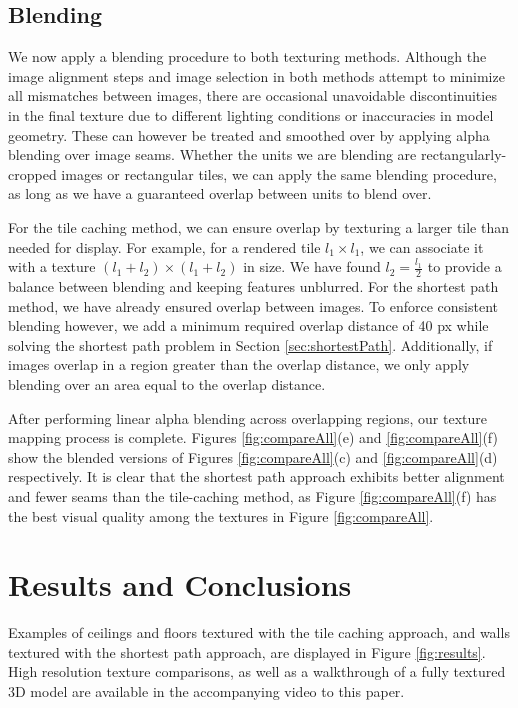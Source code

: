 \documentclass[]{spie}  %
\begin{document}
\subsection{Blending}
\label{sec:blending}
We now apply a blending procedure to both texturing methods. Although
the image alignment steps and image selection in both methods attempt
to minimize all mismatches between images, there are occasional
unavoidable discontinuities in the final texture due to different
lighting conditions or inaccuracies in model geometry. These can
however be treated and smoothed over by applying alpha blending over
image seams.  Whether the units we are blending are
rectangularly-cropped images or rectangular tiles, we can apply the
same blending procedure, as long as we have a guaranteed overlap
between units to blend over.

For the tile caching method, we can ensure overlap by texturing a
larger tile than needed for display. For example, for a rendered tile
$l_1 \times l_1$, we can associate it with a texture $(l_1 + l_2)
\times (l_1 + l_2)$ in size.  We have found $l_2 = \frac{l_1}{2}$ to
provide a balance between blending and keeping features unblurred. For
the shortest path method, we have already ensured overlap between
images. To enforce consistent blending however, we add a minimum
required overlap distance of 40 px while solving the shortest path
problem in Section \ref{sec:shortestPath}. Additionally, if images
overlap in a region greater than the overlap distance, we only apply
blending over an area equal to the overlap distance.

After performing linear alpha blending across overlapping regions, our
texture mapping process is complete. Figures \ref{fig:compareAll}(e)
and \ref{fig:compareAll}(f) show the blended versions of Figures
\ref{fig:compareAll}(c) and \ref{fig:compareAll}(d) respectively. It
is clear that the shortest path approach exhibits better alignment and
fewer seams than the tile-caching method, as Figure
\ref{fig:compareAll}(f) has the best visual quality among the textures
in Figure \ref{fig:compareAll}.

\section{Results and Conclusions}
\label{sec:resultsAndConclusions}
Examples of ceilings and floors textured with the tile caching
approach, and walls textured with the shortest path approach, are
displayed in Figure \ref{fig:results}. High resolution texture
comparisons, as well as a walkthrough of a fully textured 3D model are
available in the accompanying video to this paper.
\end{document}
